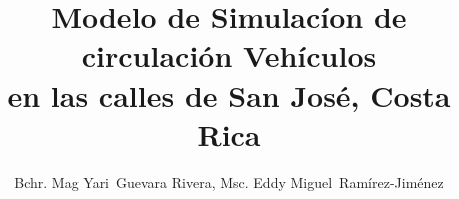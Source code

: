 \documentclass[12pt,journal,compsoc]{IEEEtran}
\begin{document}
%
\title{Modelo de Simulac\'{i}on de circulaci\'{o}n Veh\'{i}culos\\ en las calles de San Jos\'{e}, Costa Rica}
%
%
%
%

\author{Bchr. Mag Yari~Guevara Rivera,
        Msc. Eddy Miguel~Ram\'irez-Jim\'enez}%
\end{document}
